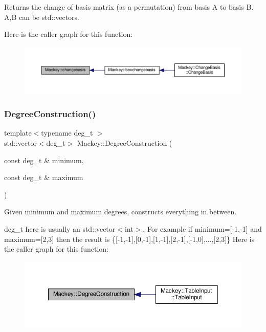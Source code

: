 Returns the change of basis matrix (as a permutation) from basis A to basis B. A,B can be std\+::vector\textquotesingle{}s. 

Here is the caller graph for this function\+:\nopagebreak
\begin{figure}[H]
\begin{center}
\leavevmode
\includegraphics[width=350pt]{namespaceMackey_a92891f5582872405be46b80b5fa1fb84_icgraph}
\end{center}
\end{figure}
\mbox{\label{namespaceMackey_a49fef6f64b67ff118d35ac45b9c92972}} 
\subsubsection{\texorpdfstring{Degree\+Construction()}{DegreeConstruction()}}
{\footnotesize\ttfamily template$<$typename deg\+\_\+t $>$ \\
std\+::vector$<$deg\+\_\+t$>$ Mackey\+::\+Degree\+Construction (\begin{DoxyParamCaption}\item[{const deg\+\_\+t \&}]{minimum,  }\item[{const deg\+\_\+t \&}]{maximum }\end{DoxyParamCaption})}

Given minimum and maximum degrees, constructs everything in between.

deg\+\_\+t here is usually an std\+::vector$<$int$>$. For example if minimum=\mbox{[}-\/1,-\/1\mbox{]} and maximum=\mbox{[}2,3\mbox{]} then the result is \{\mbox{[}-\/1,-\/1\mbox{]},\mbox{[}0,-\/1\mbox{]},\mbox{[}1,-\/1\mbox{]},\mbox{[}2,-\/1\mbox{]},\mbox{[}-\/1,0\mbox{]},...,\mbox{[}2,3\mbox{]}\} Here is the caller graph for this function\+:\nopagebreak
\begin{figure}[H]
\begin{center}
\leavevmode
\includegraphics[width=350pt]{namespaceMackey_a49fef6f64b67ff118d35ac45b9c92972_icgraph}
\end{center}
\end{figure}
\mbox{\label{namespaceMackey_a6a5d40e69e5628ea84896ee43f4a91fa}} 
